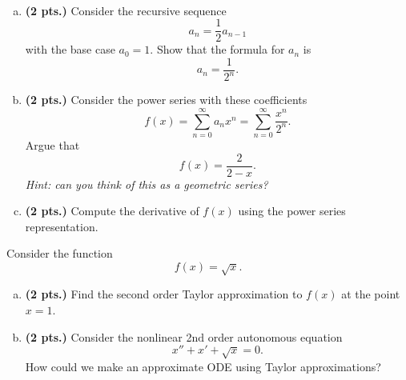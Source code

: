 \documentclass[12pt]{amsbook}
\begin{document}
\begin{problem}~
\begin{enumerate}[(a)]
\item \textbf{(2 pts.)} Consider the recursive sequence
\[
a_{n} = \frac{1}{2} a_{n-1}
\]
with the base case $a_0=1$. Show that the formula for $a_n$ is
\[
a_n = \frac{1}{2^n}.
\]
\item \textbf{(2 pts.)} Consider the power series with these coefficients
\[
f(x)=\sum_{n=0}^\infty a_n x^n = \sum_{n=0}^\infty \frac{x^n}{2^n}.
\]
Argue that
\[
f(x)=\frac{2}{2-x}.
\]
\emph{Hint: can you think of this as a geometric series?}
\item \textbf{(2 pts.)} Compute the derivative of $f(x)$ using the power series representation.
\end{enumerate}
\end{problem}


\begin{problem} Consider the function
\[
f(x)=\sqrt{x}.
\]
\begin{enumerate}[(a)]
\item \textbf{(2 pts.)} Find the second order Taylor approximation to $f(x)$ at the point $x=1$.
\item \textbf{(2 pts.)} Consider the nonlinear 2$\textrm{nd}$ order autonomous equation
\[
x'' + x' + \sqrt{x} = 0.
\]
How could we make an approximate ODE using Taylor approximations?
\end{enumerate}
\end{problem}



\end{document}
